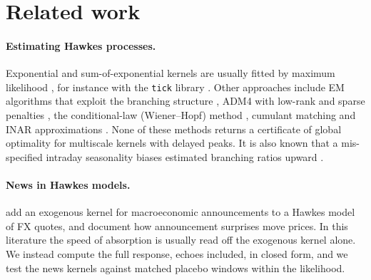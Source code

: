 \section{Related work}\label{sec:related}

\paragraph{Estimating Hawkes processes.} Exponential and sum-of-exponential kernels are usually
fitted by maximum likelihood \citep{bacry2015hawkes}, for instance with the \texttt{tick} library
\citep{bacry2018tick}. Other approaches include EM algorithms that exploit the branching
structure \citep{veen2008estimation}, ADM4 with low-rank and sparse penalties
\citep{zhou2013learning}, the conditional-law (Wiener--Hopf) method \citep{bacry2016estimation},
cumulant matching \citep{achab2017uncovering} and INAR approximations
\citep{kirchner2017estimation}. None of these methods returns a certificate of global optimality
for multiscale kernels with delayed peaks. It is also known that a mis-specified intraday
seasonality biases estimated branching ratios upward \citep{filimonov2015apparent,omi2017hawkes}.

\paragraph{News in Hawkes models.} \citet{rambaldi2015modeling} add an exogenous kernel for
macroeconomic announcements to a Hawkes model of FX quotes, and \citet{andersen2003micro} document
how announcement surprises move prices. In this literature the speed of absorption is usually
read off the exogenous kernel alone. We instead compute the full response, echoes included, in
closed form, and we test the news kernels against matched placebo windows within the likelihood.

